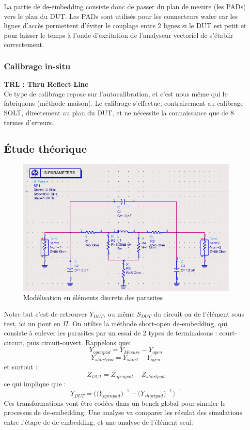 \documentclass[a4paper]{article}
\begin{document}
La partie de de-embedding consiste donc de passer du plan de mesure (les PADs) vers le plan du DUT.
Les PADs sont utilis\'es pour les connecteurs wafer car les lignes d'acc\`es permettent d'\'eviter le couplage
entre 2 lignes si le DUT est petit et pour laisser le temps \`a l'onde d'excitation de l'analyseur vectoriel
de s'\'etablir correctement.

\subsubsection{Calibrage in-situ}
\textbf{TRL : Thru Reflect Line } \\
Ce type de calibrage repose sur l'autocalibration, et c'est nous m\^eme qui le fabriquons (m\'ethode maison).
Le calibrage s'effectue, contrairement au calibrage SOLT, directement au plan du DUT, et ne n\'ecessite la connaissance
que de 8 termes d'erreurs.

\subsection{\'Etude th\'eorique}

\begin{figure}[!htb]
\begin{center}
  \includegraphics[scale=0.45]{de-embedding_scheme.png}
  \caption{Mod\'elisation en \'el\'ements discrets des parasites}
  \label{de-embedding-scheme}
\end{center}
\end{figure}

Notre but c'est de retrouver $Y_{DUT}$, ou m\^eme $S_{DUT}$ du circuit ou de l'\'el\'ement sous test, ici un pont en $\Pi$.
On utilise la m\'ethode short-open de-embedding, qui consiste \`a enlever les parasites par un essai de 2 types de terminaisons :
court-circuit, puis circuit-ouvert. Rappelons que\cite{sim-elec-cours}:
\[
Y_{openpad} = Y_{Mesure} - Y_{open}
\]
 \clearpage
 \[
Y_{shortpad} = Y_{short} - Y_{open}
\]
et surtout :
\[
Z_{DUT} = Z_{openpad} - Z_{shortpad}
\]
ce qui implique que :
\[
Y_{DUT} = \bigg( \big( Y_{openpad} \big)^{-1} - \big( Y_{shortpad} \big)^{-1} \bigg)^{-1}
\]
Ces transformations vont \^etre codées dans un bench global pour simuler le processus de de-embedding. Une analyse va comparer
les r\'esulat des simulations entre l'\'etape de de-embedding, et une analyse de l'\'el\'ement seul:
\end{document}
